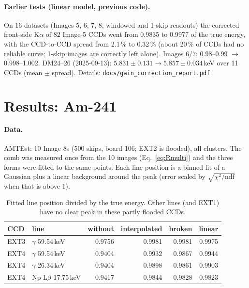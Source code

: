 \documentclass[11pt,a4paper]{article}
\newcommand{\code}[1]{\texttt{#1}}
\begin{document}
\paragraph{Earlier tests (linear model, previous code).} On 16 datasets (Images 5, 6, 7, 8, windowed and
1-skip readouts) the corrected front-side K$\alpha$ of 82 Image-5 CCDs went from 0.9835 to 0.9977 of the
true energy, with the CCD-to-CCD spread from 2.1\,\% to 0.32\,\% (about 20\,\% of CCDs had no reliable
curve; 1-skip images are correctly left alone). Images 6/7: 0.98--0.99 $\to$ 0.998--1.002. DM24--26
(2025-09-13): $5.831 \pm 0.131 \to 5.857 \pm 0.034$\,keV over 11 CCDs (mean $\pm$ spread). Details:
\code{docs/gain\_correction\_report.pdf}.

\section{Results: Am-241}
\label{sec:am}
\paragraph{Data.} AMTEst: 10 Image 8s (500 skips, board 106; EXT2 is flooded), all clusters. The comb
was measured once from the 10 images (Eq.~\ref{eq:Rmulti}) and the three forms were fitted to the same
points. Each line position is a binned fit of a Gaussian plus a linear background around the peak
(error scaled by $\sqrt{\chi^2/\mathrm{ndf}}$ when that is above 1).

\begin{table}[h]
\centering
\begin{tabular}{llrrrr}
\toprule
CCD & line & without & interpolated & broken & linear \\
\midrule
EXT3 & $\gamma$ 59.54\,keV & 0.9756 & 0.9981 & 0.9981 & 0.9975 \\
EXT4 & $\gamma$ 59.54\,keV & 0.9404 & 0.9932 & 0.9867 & 0.9944 \\
EXT4 & $\gamma$ 26.34\,keV & 0.9404 & 0.9898 & 0.9861 & 0.9903 \\
EXT4 & Np L$\beta$ 17.75\,keV & 0.9417 & 0.9844 & 0.9828 & 0.9823 \\
\bottomrule
\end{tabular}
\caption{Fitted line position divided by the true energy. Other lines (and EXT1) have no clear peak in
these partly flooded CCDs.}
\label{tab:am}
\end{table}
\end{document}
